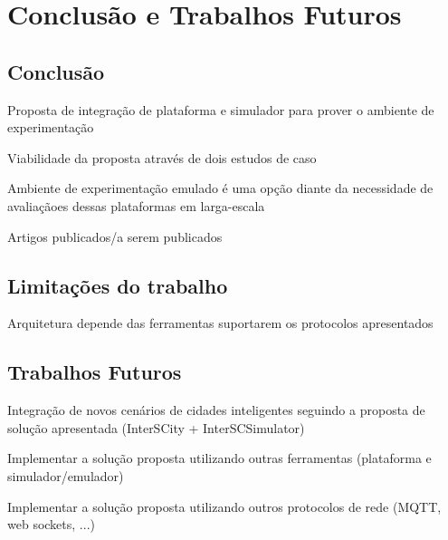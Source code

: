 \chapter{Conclusão e Trabalhos Futuros}
\label{cap:conclusao}

\section{Conclusão}

Proposta de integração de plataforma e simulador para prover o ambiente de
experimentação

Viabilidade da proposta através de dois estudos de caso

Ambiente de experimentação emulado é uma opção diante da necessidade de
avaliaçãoes dessas plataformas em larga-escala

Artigos publicados/a serem publicados

\section{Limitações do trabalho}

Arquitetura depende das ferramentas suportarem os protocolos apresentados

\section{Trabalhos Futuros}

Integração de novos cenários de cidades inteligentes seguindo a proposta de
solução apresentada (InterSCity + InterSCSimulator)

Implementar a solução proposta utilizando outras ferramentas (plataforma e
simulador/emulador)

Implementar a solução proposta utilizando outros protocolos de rede (MQTT, web
sockets, ...)
